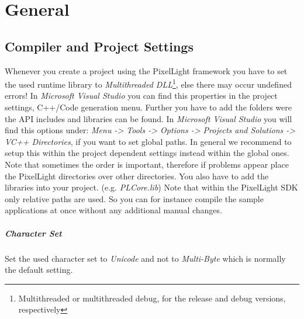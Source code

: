 \chapter{General}




\section{Compiler and Project Settings}
Whenever you create a project using the PixelLight framework you have to set the used runtime library to \emph{Multithreaded DLL}\footnote{Multithreaded or multithreaded debug, for the release and debug versions, respectively}, else there may occur undefined errors! In \emph{Microsoft Visual Studio} you can find this properties in the project settings, C++/Code generation menu. Further you have to add the folders were the API includes and libraries can be found. In \emph{Microsoft Visual Studio} you will find this options under: \emph{Menu -> Tools -> Options -> Projects and Solutions -> VC++ Directories}, if you want to set global paths. In general we recommend to setup this within the project dependent settings instead within the global ones. Note that sometimes the order is important, therefore if problems appear place the PixelLight directories over other directories. You also have to add the libraries into your project. (e.g. \emph{PLCore.lib}) Note that within the PixelLight SDK only relative paths are used. So you can for instance compile the sample applications at once without any additional manual changes.


\paragraph{Character Set}
Set the used character set to \emph{Unicode} and not to \emph{Multi-Byte} which is normally the default setting.


